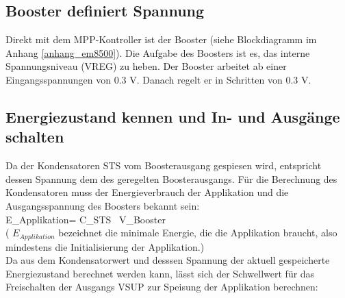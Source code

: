 \subsection{Booster definiert Spannung}
Direkt mit dem MPP-Kontroller ist der Booster (siehe Blockdiagramm im Anhang \ref{anhang_em8500}). Die Aufgabe des Boosters ist es, das interne Spannungsniveau (VREG) zu heben. Der Booster arbeitet ab einer Eingangsspannungen von 0.3 V. Danach regelt er in Schritten von 0.3 V. \\



\subsection{Energiezustand kennen und In- und Ausgänge schalten}
Da der Kondensatoren STS vom Boosterausgang gespiesen wird, entspricht dessen Spannung dem des geregelten Boosterausgangs. Für die Berechnung des Kondensatoren muss der Energieverbrauch der Applikation und die Ausgangsspannung des Boosters bekannt sein:\\


  E_{Applikation}= C_{STS} \times {}\, V_{Booster} \\

 
( $E_{Applikation}$ bezeichnet die  minimale Energie, die die Applikation braucht, also mindestens die Initialisierung der Applikation.)\\

Da aus dem Kondensatorwert und desssen Spannung der aktuell gespeicherte Energiezustand berechnet werden kann, lässt sich der Schwellwert für das Freischalten der Ausgangs VSUP zur Speisung der Applikation berechnen:\\

